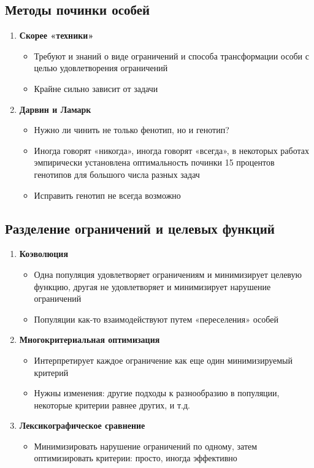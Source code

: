 \subsection{Методы починки особей}
\begin{enumerate}
    \item \textbf{Скорее «техники»}
    \begin{itemize}
        \item Требуют и знаний о виде ограничений и способа трансформации особи с целью удовлетворения ограничений
        \item Крайне сильно зависит от задачи
    \end{itemize}

    \item \textbf{Дарвин и Ламарк}
    \begin{itemize}
        \item Нужно ли чинить не только фенотип, но и генотип?
        \item Иногда говорят «никогда», иногда говорят «всегда», в некоторых работах эмпирически установлена оптимальность починки 15 процентов генотипов для большого числа разных задач
        \item Исправить генотип не всегда возможно
    \end{itemize}

\end{enumerate}

\subsection{Разделение ограничений и целевых функций}
\begin{enumerate}
    \item \textbf{Коэволюция}
    \begin{itemize}
        \item Одна популяция удовлетворяет ограничениям и минимизирует целевую функцию, другая не удовлетворяет и минимизирует нарушение ограничений
        \item Популяции как-то взаимодействуют путем «переселения» особей
    \end{itemize}

    \item \textbf{Многокритериальная оптимизация}
    \begin{itemize}
        \item Интерпретирует каждое ограничение как еще один минимизируемый критерий
        \item Нужны изменения: другие подходы к разнообразию в популяции, некоторые критерии равнее других, и т.д.
    \end{itemize}

    \item \textbf{Лексикографическое сравнение}
    \begin{itemize}
        \item  Минимизировать нарушение ограничений по одному, затем оптимизировать критерии: просто, иногда эффективно
    \end{itemize}
\end{enumerate}